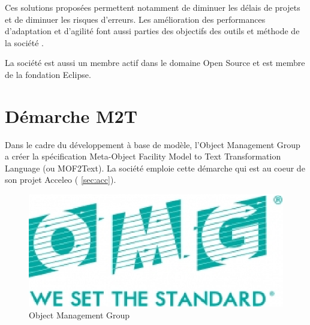 Ces solutions proposées permettent notamment de diminuer les délais de projets et de diminuer les risques d'erreurs. Les amélioration des performances d'adaptation et d'agilité font aussi parties des objectifs des outils et méthode de la société \kwobeo{}.

La société \kwobeo{} est aussi un membre actif dans le domaine Open Source et est membre de la fondation Eclipse.






\section{Démarche M2T}\label{sec:m2t}

Dans le cadre du développement à base de modèle, l'Object Management Group \cite{omg} a créer la spécification Meta-Object Facility Model to Text Transformation Language (ou MOF2Text). La société \kwobeo emploie cette démarche qui est au coeur de son projet Acceleo (\cf{} \ref{sec:acc}).

\begin{figure}[htb]
  \centering
  \includegraphics[scale=.4]{img/omg.eps}
  \caption{Object Management Group}
  \label{fig:omg}
\end{figure}


